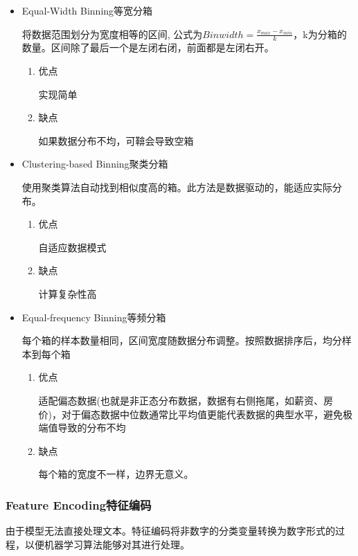 \documentclass[UTF8]{ctexart}
\begin{document}
\begin{itemize}
    \item Equal-Width Binning等宽分箱
    
    将数据范围划分为宽度相等的区间, 公式为$Bin width=\frac{x_{max}-x_{min}}{k}$，k为分箱的数量。区间除了最后一个是左闭右闭，前面都是左闭右开。
    \begin{enumerate}
        \item 优点
        
        实现简单
        \item 缺点
        
        如果数据分布不均，可鞥会导致空箱
    \end{enumerate}
    \item Clustering-based Binning聚类分箱
    
    使用聚类算法自动找到相似度高的箱。此方法是数据驱动的，能适应实际分布。
    \begin{enumerate}
        \item 优点
        
        自适应数据模式
        \item 缺点
        
        计算复杂性高
    \end{enumerate}
    \item Equal-frequency Binning等频分箱
    
    每个箱的样本数量相同，区间宽度随数据分布调整。按照数据排序后，均分样本到每个箱

    \begin{enumerate}
        \item 优点
        
        适配偏态数据(也就是非正态分布数据，数据有右侧拖尾，如薪资、房价)，对于偏态数据中位数通常比平均值更能代表数据的典型水平，避免极端值导致的分布不均
        \item 缺点
        
        每个箱的宽度不一样，边界无意义。
    \end{enumerate}

\end{itemize}

\subsubsection{Feature Encoding特征编码}
由于模型无法直接处理文本。特征编码将非数字的分类变量转换为数字形式的过程，以便机器学习算法能够对其进行处理。
\end{document}
